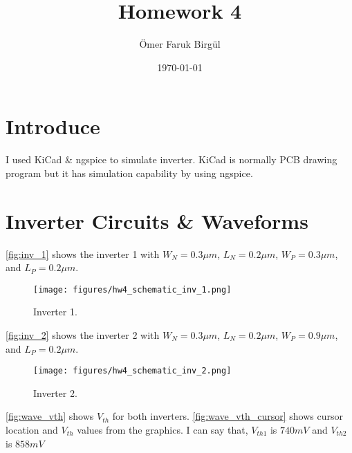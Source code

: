 \documentclass[a4paper,10pt]{article}
\author{Ömer Faruk Birgül}
\title{Homework 4}
\date{\today}
\begin{document}
\maketitle
\section{Introduce}
I used KiCad \& ngspice to simulate inverter. KiCad is normally PCB drawing program but it has simulation capability by using ngspice.
\section{Inverter Circuits \& Waveforms}

\autoref{fig:inv_1} shows the inverter 1 with $W_N = 0.3\mu m$, $L_N = 0.2\mu m$, $W_P = 0.3\mu m$, and $L_P = 0.2\mu m$.
\begin{figure}[!h]
 \centering
 \texttt{[image: figures/hw4\_schematic\_inv\_1.png]}
 \caption{Inverter 1.}
 \label{fig:inv_1}
\end{figure}

\autoref{fig:inv_2} shows the inverter 2 with $W_N = 0.3\mu m$, $L_N = 0.2\mu m$, $W_P = 0.9\mu m$, and $L_P = 0.2\mu m$.
\begin{figure}[!h]
 \centering
 \texttt{[image: figures/hw4\_schematic\_inv\_2.png]}
 \caption{Inverter 2.}
 \label{fig:inv_2}
\end{figure}


\newpage
\autoref{fig:wave_vth} shows $V_{th}$ for both inverters. \autoref{fig:wave_vth_cursor} shows cursor location and $V_{th}$ values from the graphics. I can say that, $V_{th1}$ is $740mV$ and $V_{th2}$ is $858mV$
\end{document}
